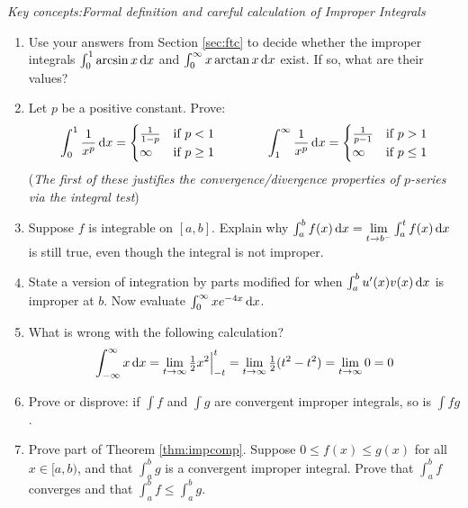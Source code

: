 \begin{exercises}
	\emph{Key concepts:\quad Formal definition and careful calculation of Improper Integrals}

	\begin{enumerate}
	  \item Use your answers from Section \ref{sec:ftc} to decide whether the improper integrals $\int_0^1\arcsin x\,{\mathrm{d} x}$ and $\int_0^\infty x\arctan x\,{\mathrm{d} x}$ exist. If so, what are their values?
	  
	  
	 	\item Let $p$ be a positive constant. Prove:
	  \[
	  	\int_0^1\frac 1{x^p}\,{\mathrm{d} x}=
	  	\begin{cases}
	  		\frac 1{1-p}&\text{if }p<1\\
	  		\infty&\text{if }p\ge 1
	  	\end{cases}
	  	\qquad\qquad
	  	\int_1^\infty\frac 1{x^p}\,{\mathrm{d} x}=
	  	\begin{cases}
	  		\frac 1{p-1}&\text{if }p>1\\
	  		\infty&\text{if }p\le 1
	  	\end{cases}
	  \]
	  (\emph{The first of these justifies the convergence/divergence properties of $p$-series via the integral test})
	  
	  
	  \item Suppose $f$ is integrable on $[a,b]$. Explain why $\int_a^bf(x)\,{\mathrm{d} x}=\lim\limits_{t\to b^-}\int_a^tf(x)\,{\mathrm{d} x}$ is still true, even though the integral is not improper.  
	  
	  
	  \item State a version of integration by parts modified for when $\int_a^b u'(x)v(x)\,{\mathrm{d} x}$ is improper at $b$. Now evaluate $\int_0^\infty xe^{-4x}\,{\mathrm{d} x}$.
	  
	  
	  \item What is wrong with the following calculation?
	  \[\int_{-\infty}^\infty x\,{\mathrm{d} x}=\lim_{t\to\infty}\tfrac 12x^2\Big|_{-t}^t =\lim_{t\to\infty}\tfrac 12(t^2-t^2) =\lim_{t\to\infty}0=0\]
	  
		\item Prove or disprove: if $\int f$ and $\int g$ are convergent improper integrals, so is $\int fg$.
	  
	  \item\label{ex:impropercomp} Prove part of Theorem \ref{thm:impcomp}. Suppose $0\le f(x)\le g(x)$ for all $x\in[a,b)$, and that $\int_a^bg$ is a convergent improper integral. Prove that $\int_a^bf$ converges and that $\int_a^bf\le\int_a^bg$.
	

\end{enumerate}
\end{exercises}
